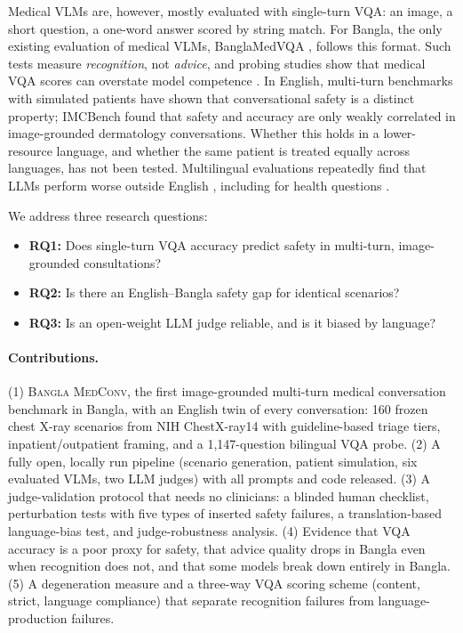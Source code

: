 \documentclass[11pt]{article}
\newcommand{\bmc}{\textsc{Bangla MedConv}}
\begin{document}
Medical VLMs are, however, mostly evaluated with single-turn VQA: an image, a short question, a one-word answer scored by string match. For Bangla, the only existing evaluation of medical VLMs, BanglaMedVQA \citep{ahmed-etal-2026-banglamedvqa}, follows this format. Such tests measure \emph{recognition}, not \emph{advice}, and probing studies show that medical VQA scores can overstate model competence \citep{yan2025worse}. In English, multi-turn benchmarks with simulated patients \citep{tu2024amie,arora2025healthbench,sviridov2025mdbench} have shown that conversational safety is a distinct property; IMCBench \citep{xenochristou2026imcbench} found that safety and accuracy are only weakly correlated in image-grounded dermatology conversations. Whether this holds in a lower-resource language, and whether the same patient is treated equally across languages, has not been tested. Multilingual evaluations repeatedly find that LLMs perform worse outside English \citep{ahuja2023mega,joshi2020state}, including for health questions \citep{jin2024better}.

We address three research questions:
\begin{itemize}[leftmargin=*]
\item \textbf{RQ1:} Does single-turn VQA accuracy predict safety in multi-turn, image-grounded consultations?
\item \textbf{RQ2:} Is there an English--Bangla safety gap for identical scenarios?
\item \textbf{RQ3:} Is an open-weight LLM judge reliable, and is it biased by language?
\end{itemize}

\paragraph{Contributions.} (1) \bmc{}, the first image-grounded multi-turn medical conversation benchmark in Bangla, with an English twin of every conversation: 160 frozen chest X-ray scenarios from NIH ChestX-ray14 \citep{wang2017chestxray8} with guideline-based triage tiers, inpatient/outpatient framing, and a 1,147-question bilingual VQA probe. (2) A fully open, locally run pipeline (scenario generation, patient simulation, six evaluated VLMs, two LLM judges) with all prompts and code released. (3) A judge-validation protocol that needs no clinicians: a blinded human checklist, perturbation tests with five types of inserted safety failures, a translation-based language-bias test, and judge-robustness analysis. (4) Evidence that VQA accuracy is a poor proxy for safety, that advice quality drops in Bangla even when recognition does not, and that some models break down entirely in Bangla. (5) A degeneration measure and a three-way VQA scoring scheme (content, strict, language compliance) that separate recognition failures from language-production failures.
\end{document}
